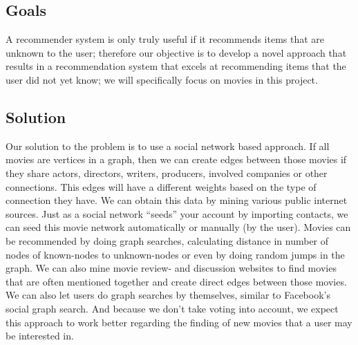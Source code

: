 \subsection{Goals}
\label{sec:intro:goals}
A recommender system is only truly useful if it recommends items that are unknown to the user; therefore our
objective is to develop a novel approach that results in a recommendation system that excels at recommending items
that the user did not yet know; we will specifically focus on movies in this project.

\subsection{Solution}
\label{sec:intro:solution}
Our solution to the problem is to use a social network based approach. If all movies are vertices in a graph, then we
can create edges between those movies if they share actors, directors, writers, producers, involved companies or other
connections. This edges will have a different weights based on the type of connection they have. We can obtain this
data by mining various public internet sources. Just as a social network “seeds” your account by importing contacts,
we can seed this movie network automatically or manually (by the user). Movies can be recommended by doing graph
searches, calculating distance in number of nodes of known-nodes to unknown-nodes or even by doing random jumps
in the graph. We can also mine movie review- and discussion websites to find movies that are often mentioned
together and create direct edges between those movies. We can also let users do graph searches by themselves, similar
to Facebook’s social graph search. And because we don’t take voting into account, we expect this approach to work
better regarding the finding of new movies that a user may be interested in.